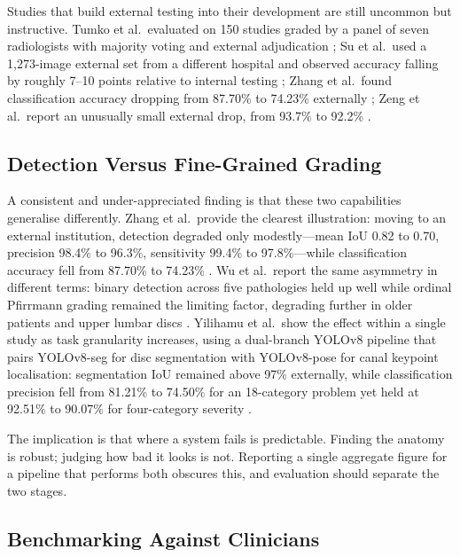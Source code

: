 Studies that build external testing into their development are still uncommon
but instructive. Tumko et al.\ evaluated on 150 studies graded by a panel of
seven radiologists with majority voting and external adjudication
\cite{tumko2024a}; Su et al.\ used a 1{,}273-image external set from a different
hospital and observed accuracy falling by roughly 7--10 points relative to
internal testing \cite{su2022automatic}; Zhang et al.\ found classification
accuracy dropping from 87.70\% to 74.23\% externally \cite{zhang2023deep}; Zeng
et al.\ report an unusually small external drop, from 93.7\% to 92.2\%
\cite{zeng2025gpt4lfs}.

\subsection{Detection Versus Fine-Grained Grading}
\label{sec:lr-detection-vs-grading}

A consistent and under-appreciated finding is that these two capabilities
generalise differently. Zhang et al.\ provide the clearest illustration:
moving to an external institution, detection degraded only modestly---mean IoU
0.82 to 0.70, precision 98.4\% to 96.3\%, sensitivity 99.4\% to 97.8\%---while
classification accuracy fell from 87.70\% to 74.23\% \cite{zhang2023deep}. Wu et
al.\ report the same asymmetry in different terms: binary detection across five
pathologies held up well while ordinal Pfirrmann grading remained the limiting
factor, degrading further in older patients and upper lumbar discs
\cite{wu2026external}. Yilihamu et al.\ show the effect within a single study as
task granularity increases, using a dual-branch YOLOv8 pipeline that pairs
YOLOv8-seg for disc segmentation with YOLOv8-pose for canal keypoint
localisation: segmentation IoU remained above 97\% externally,
while classification precision fell from 81.21\% to 74.50\% for an 18-category
problem yet held at 92.51\% to 90.07\% for four-category severity
\cite{yilihamu2025quantification}.

The implication is that where a system fails is predictable. Finding the anatomy
is robust; judging how bad it looks is not. Reporting a single aggregate figure
for a pipeline that performs both obscures this, and evaluation should separate
the two stages.

\subsection{Benchmarking Against Clinicians}
\label{sec:lr-clinician-benchmark}

